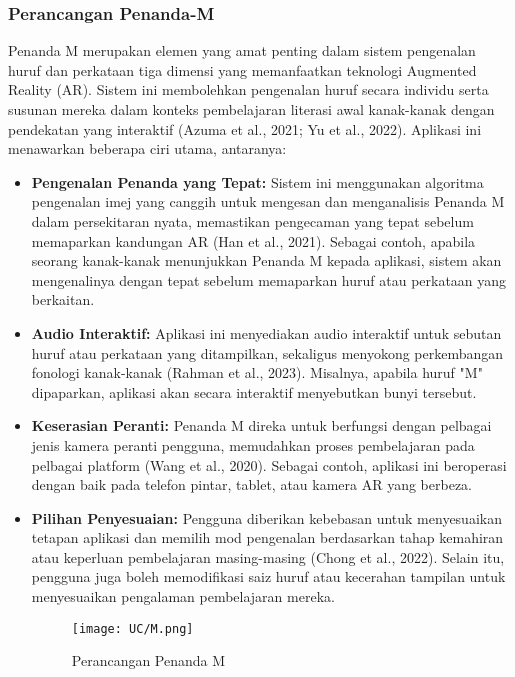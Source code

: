 \begin{itemize}
\begin{itemize}
\begin{itemize}
\subsubsection{Perancangan Penanda-M}
  
Penanda M merupakan elemen yang amat penting dalam sistem pengenalan huruf dan perkataan tiga dimensi yang memanfaatkan teknologi Augmented Reality (AR). Sistem ini membolehkan pengenalan huruf secara individu serta susunan mereka dalam konteks pembelajaran literasi awal kanak-kanak dengan pendekatan yang interaktif (Azuma et al., 2021; Yu et al., 2022). Aplikasi ini menawarkan beberapa ciri utama, antaranya:  \\  
\begin{itemize}  
\item \textbf{Pengenalan Penanda yang Tepat:} Sistem ini menggunakan algoritma pengenalan imej yang canggih untuk mengesan dan menganalisis Penanda M dalam persekitaran nyata, memastikan pengecaman yang tepat sebelum memaparkan kandungan AR (Han et al., 2021). Sebagai contoh, apabila seorang kanak-kanak menunjukkan Penanda M kepada aplikasi, sistem akan mengenalinya dengan tepat sebelum memaparkan huruf atau perkataan yang berkaitan.\\  
\item \textbf{Audio Interaktif:} Aplikasi ini menyediakan audio interaktif untuk sebutan huruf atau perkataan yang ditampilkan, sekaligus menyokong perkembangan fonologi kanak-kanak (Rahman et al., 2023). Misalnya, apabila huruf "M" dipaparkan, aplikasi akan secara interaktif menyebutkan bunyi tersebut.\\  
\item \textbf{Keserasian Peranti:} Penanda M direka untuk berfungsi dengan pelbagai jenis kamera peranti pengguna, memudahkan proses pembelajaran pada pelbagai platform (Wang et al., 2020). Sebagai contoh, aplikasi ini beroperasi dengan baik pada telefon pintar, tablet, atau kamera AR yang berbeza.\\  
\item \textbf{Pilihan Penyesuaian:} Pengguna diberikan kebebasan untuk menyesuaikan tetapan aplikasi dan memilih mod pengenalan berdasarkan tahap kemahiran atau keperluan pembelajaran masing-masing (Chong et al., 2022). Selain itu, pengguna juga boleh memodifikasi saiz huruf atau kecerahan tampilan untuk menyesuaikan pengalaman pembelajaran mereka.  
 
\begin{figure}
    \centering
    \texttt{[image: UC/M.png]}
    \caption{Perancangan Penanda M}
    \label{fig:enter-label}
\end{figure}
\clearpage


\end{itemize}
\end{itemize}
\end{itemize}
\end{itemize}
